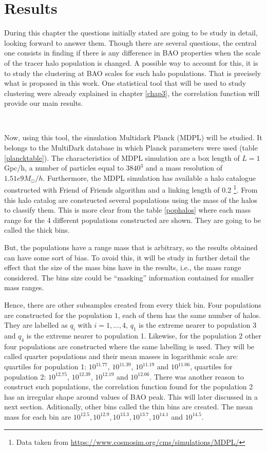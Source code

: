 \chapter{ Results }

During this chapter the questions initially stated are going to be study in detail, 
looking forward to answer them. Though there are several questions, the central one
consists in finding if there is any difference in BAO properties when the scale of the tracer
halo population is changed. A possible way to account for this, it is to study the 
clustering at BAO scales for such halo populations. That is precisely what is proposed
in this work. 
One statistical tool that will be used to study clustering were already explained in chapter \ref{chap3},
the correlation function will provide our main results. 

\

Now, using this tool, the simulation Multidark Planck (MDPL) will be studied. 
It belongs to the MultiDark database in which Planck parameters were used
(table \ref{plancktable}). The characteristics of MDPL
simulation are a box length of $L=1$Gpc/h, a number of particles equal to 
$3840^3$ and a mass resolution of $1.51e9 M_{\odot}/h$.
Furthermore, the MDPL simulation has available a halo catalogue constructed with Friend of 
Friends algorithm and a linking length of 0.2 \footnote{ Data taken from \url{https://www.cosmosim.org/cms/simulations/MDPL/}}. 
From this halo catalog are constructed several populations using the mass of the halos to
classify them. This is more clear from the table \ref{pophalos} where each mass range for 
the 4 different populations constructed are shown. They are going to be called the 
thick bins. 

But, the populations have a range mass that is arbitrary, so
the results obtained can have some sort of bias. To avoid this, 
it will be study in further detail the effect that 
the size of the mass bins have in the results, i.e., the mass
range considered. The bins size could be ``masking'' information
contained for smaller mass ranges. 	

Hence, there are other subsamples created from every thick bin.
Four populations are constructed for the population $1$,  
each of them has the same number of halos. %
They are labelled as $q_i$ with $i=1,\dots,4$, $q_1$ is the extreme 
nearer to population 3 and $q_4$ is the extreme nearer to population 1. 
Likewise, for the population $2$ other four populations are constructed where
the same labelling is used. They will be called quarter populations and their
mean masses in logarithmic scale are: quartiles for population 1: $10^{11.77}$, $10^{11.39}$, $10^{11.19}$ and $10^{11.06}$, quartiles for population 2:
$10^{12.75}$, $10^{12.39}$, $10^{12.19}$ and $10^{12.06}$.
There was another reason to construct such populations, the correlation function
found for the population 2 has an irregular shape around values of BAO peak. This
will later discussed in a next section. 
Aditionally, other bins called the thin bins are created. The mean mass for each 
bin are $10^{12.5}, 10^{12.9}, 10^{13.3}, 10^{13.7}, 10^{14.1}$ and $10^{14.5}$. 


